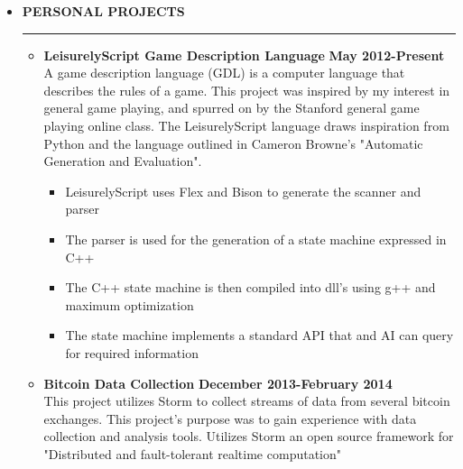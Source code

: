 \documentclass[overlapped]{res}
\begin{document}
\begin{resume}
\vspace{0.25in}
\begin{itemize}[leftmargin=0in]
    \item[] \textbf{PERSONAL PROJECTS} \\[-0.1in] \rule{\textwidth}{0.5pt}
        \begin{itemize}[leftmargin=0in]
            \item[] 
                \begin{samepage}
                    \textbf{LeisurelyScript Game Description Language} \hfill \textbf{May 2012-Present} \\
                    A game description language (GDL) is a computer language that describes the rules of a game.  
                    This project was inspired by my interest in general game playing, and spurred on by the 
                    Stanford general game playing online class.  The LeisurelyScript language draws inspiration 
                    from Python and the language outlined in Cameron Browne's "Automatic Generation and Evaluation".  
                    \begin{itemize}
                        \item[\textbullet] LeisurelyScript uses Flex and Bison to generate the scanner and parser
                        \item[\textbullet] The parser is used for the generation of a state machine expressed in C++
                        \item[\textbullet] The C++ state machine is then compiled into dll's using g++ and maximum optimization
                        \item[\textbullet] The state machine implements a standard API that and AI can query for required information
                    \end{itemize}
                \end{samepage}
            \item[] 
                \begin{samepage}
                    \textbf{Bitcoin Data Collection} \hfill \textbf{December 2013-February 2014} \\
                    This project utilizes Storm to collect streams of data from several bitcoin exchanges.  This 
                    project's purpose was to gain experience with data collection and analysis tools.  Utilizes 
                    Storm an open source framework for "Distributed and fault-tolerant realtime computation"
                    \begin{itemize}

\end{itemize}
\end{samepage}
\end{itemize}
\end{itemize}
\end{resume}
\end{document}
